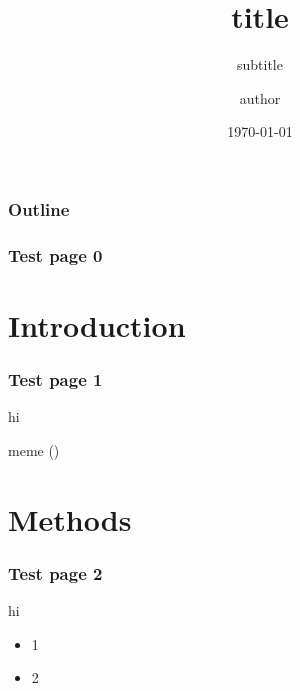 \documentclass{beamer}
\title{title}
\author{author}
\date{\today}
\institute{affiliation}
\subtitle{subtitle}
\begin{document}

\begin{frame}
    \titlepage
\end{frame}

\begin{frame}
    \frametitle{Outline}
    \tableofcontents
\end{frame}


\begin{frame}
\frametitle{Test page 0}
\end{frame}

\section{Introduction}

\begin{frame}
\frametitle{Test page 1}

hi \pause 

meme ()

\end{frame}

\section{Methods}
\begin{frame}
    
\frametitle{Test page 2}

hi
\begin{itemize}
    \item<1-> 1 
    \item<2-> 2 
\end{itemize}

\end{frame}

\end{document}
